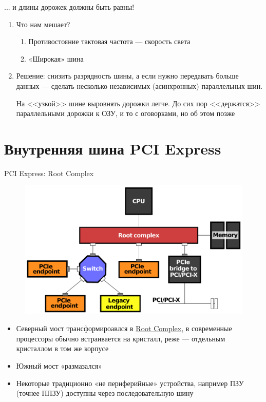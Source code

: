 \documentclass[xetex,aspectratio=43]{beamer}
\begin{document}
\begin{frame}{... и длины дорожек должны быть равны!}
    \begin{enumerate}
        \item Что нам мешает?
        \begin{enumerate}
            \item Противостояние тактовая частота --- скорость света
            \item «Широкая» шина
        \end{enumerate}
        \pause
        \item \alert{Решение: снизить разрядность шины, а если нужно передавать больше данных --- сделать несколько независимых (асинхронных) параллельных шин.}

        На <<узкой>> шине выровнять дорожки легче. До сих пор <<держатся>> параллельными дорожки к ОЗУ, и то с оговорками, но об этом позже
    \end{enumerate}
\end{frame}

\section{Внутренняя шина PCI Express}

\begin{frame}{PCI Express: Root Complex}
	\begin{figure}
        \includegraphics[height=0.5\textheight]{img/04.Example_PCI_Express_Topology.pdf}
    \end{figure}
    \begin{itemize}
        \item Северный мост трансформироавлся в \href{https://en.wikipedia.org/wiki/Root_complex}{Root Complex}, в современные процессоры обычно встраивается на кристалл, реже --- отдельным кристаллом в том же корпусе
        \item Южный мост «размазался»
        \item Некоторые традиционно «не периферийные» устройства, например ПЗУ (точнее ППЗУ) доступны через последовательную шину
    \end{itemize}
\end{frame}
\end{document}
